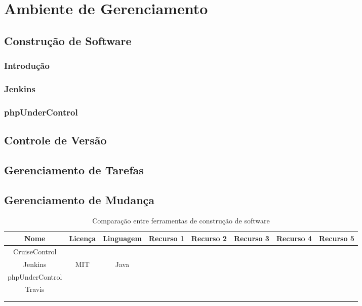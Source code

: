 \documentclass[12pt,a4paper]{article}
\begin{document}
\section{Ambiente de Gerenciamento}
	\subsection{Construção de Software}
		\subsubsection{Introdução}
		\subsubsection{Jenkins}
		\subsubsection{phpUnderControl}
	\subsection{Controle de Versão}
	\subsection{Gerenciamento de Tarefas}
	\subsection{Gerenciamento de Mudança}
		
		\begin{table}[h]
			\tabcolsep=0.11cm
			\begin{tabular}{|c|c|c|c|c|c|c|c|}
			\hline Nome 			& Licença 	& Linguagem & Recurso 1 & Recurso 2 & Recurso 3 & Recurso 4 & Recurso 5 \\ 
			\hline  CruiseControl	&  			&  			&  			&  			&  			&  			&  			\\ 
			\hline  Jenkins			& MIT		& Java		&  			&  			&  			&  			&  			\\ 
			\hline  phpUnderControl	&  			&  			&  			&  			&  			&  			&  			\\ 
			\hline  Travis			&  			&  			&  			&  			&  			&  			&  			\\ 
			\hline  				&  			&  			&  			&  			&  			&  			&  			\\ 
			\hline  				&  			&  			&  			&  			&  			&  			&  			\\ 
			\hline 
			\end{tabular} 
			\caption{Comparação entre ferramentas de construção de software}
		\end{table}
\clearpage
\nocite{*}
		
		
\end{document}
